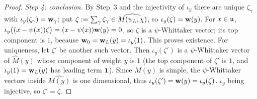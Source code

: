 \documentclass{article}
\theoremstyle{plain}
\theoremstyle{definition}
\theoremstyle{remark}
\numberwithin{equation}{section}
\begin{document}
\begin{proof}
\emph{Step 4: conclusion.} By Step~3 and the injectivity of $\iota_y$ there are unique $\zeta_\gamma$ with $\iota_y(\zeta_\gamma)=\mathbf w_\gamma$; put $\zeta:=\sum_\gamma\zeta_\gamma\in\widehat{M(\psi_L, \chi)}$, so $\iota_y(\zeta)=\mathbf w(y)$. For $x\in\mathfrak{u}$, $\iota_y\bigl((x-\psi(x))\zeta\bigr)=(x-\psi(x))\mathbf w(y)=0$, so $\zeta$ is a $\psi$-Whittaker vector; its top component is $1$, because $\mathbf w_0=\mathbf w_L(y)=\iota_y(1)$. This proves existence. For uniqueness, let $\zeta'$ be another such vector. Then $\iota_y(\zeta')$ is a $\psi$-Whittaker vector of $\widehat M(y)$ whose component of weight $y$ is $1$ (the top component of $\zeta'$ is $1$, and $\iota_y(1)=\mathbf w_L(y)$ has leading term $\mathbf 1$). Since $M(y)$ is simple, the $\psi$-Whittaker vectors inside $\widehat{M(y)}$ is one dimensional, thus $\iota_y(\zeta')=\mathbf w(y)=\iota_y(\zeta)$. $\iota_y$ being injective, so $\zeta'=\zeta$.
\end{proof}
\end{document}
